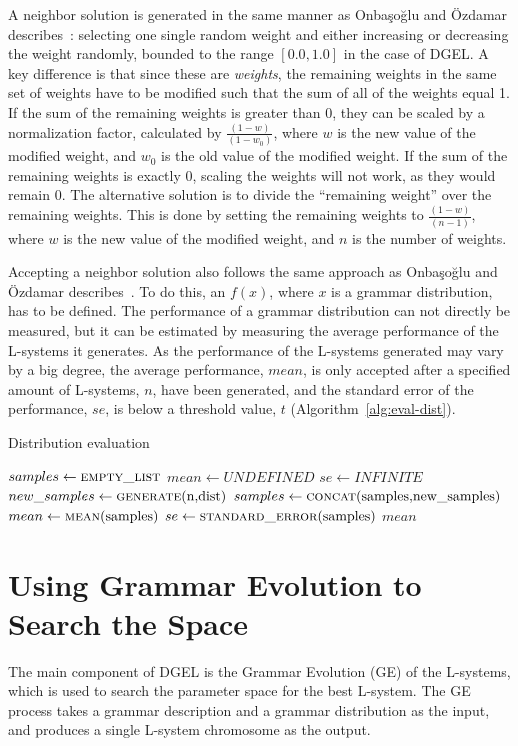 A neighbor solution is generated in the same manner as Onbaşoğlu and Özdamar describes~\cite{2001Onbasoglu}: selecting one single random weight and either increasing or decreasing the weight randomly, bounded to the range $[0.0, 1.0]$ in the case of DGEL.
A key difference is that since these are \textit{weights}, the remaining weights in the same set of weights have to be modified such that the sum of all of the weights equal 1.
If the sum of the remaining weights is greater than 0, they can be scaled by a normalization factor, calculated by $\frac{(1 - w)}{(1 - w_0)}$, where $w$ is the new value of the modified weight, and $w_0$ is the old value of the modified weight.
If the sum of the remaining weights is exactly 0, scaling the weights will not work, as they would remain 0.
The alternative solution is to divide the ``remaining weight'' over the remaining weights.
This is done by setting the remaining weights to $\frac{(1 - w)}{(n - 1)}$, where $w$ is the new value of the modified weight, and $n$ is the number of weights.

Accepting a neighbor solution also follows the same approach as Onbaşoğlu and Özdamar describes~\cite{2001Onbasoglu}.
To do this, an $f(x)$, where $x$ is a grammar distribution, has to be defined.
The performance of a grammar distribution can not directly be measured, but it can be estimated by measuring the average performance of the L-systems it generates.
As the performance of the L-systems generated may vary by a big degree, the average performance, $mean$, is only accepted after a specified amount of L-systems, $n$, have been generated, and the standard error of the performance, $se$, is below a threshold value, $t$ (Algorithm~\ref{alg:eval-dist}).

\begin{algorithm}
\caption{Distribution evaluation}
\label{alg:eval-dist}
\begin{algorithmic}
    \State $samples\gets \Call{empty\_list}{}$
    \State $mean\gets UNDEFINED$
    \State $se\gets INFINITE$
        \State $new\_samples\gets \Call{generate}{$n$, $dist$}$
        \State $samples\gets \Call{concat}{$samples$, $new\_samples$}$
        \State $mean\gets \Call{mean}{$samples$}$
        \State $se\gets \Call{standard\_error}{$samples$}$
    \EndWhile
    \State \Return $mean$
\EndFunction
\end{algorithmic}
\end{algorithm}

\section{Using Grammar Evolution to Search the Space}
The main component of DGEL is the Grammar Evolution (GE) of the L-systems, which is used to search the parameter space for the best L-system.
The GE process takes a grammar description and a grammar distribution as the input, and produces a single L-system chromosome as the output.

